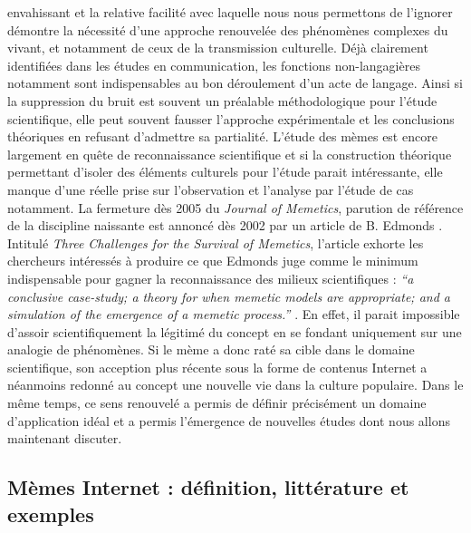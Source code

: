 envahissant et la relative facilit\'e avec laquelle nous nous permettons de l{\textquoteright}ignorer d\'emontre la n\'ecessit\'e d{\textquoteright}une approche renouvel\'ee des ph\'enom\`enes complexes du vivant, et notamment de ceux de la transmission culturelle. D\'ej\`a clairement identifi\'ees dans les \'etudes en communication, les fonctions non-langagi\`eres notamment sont indispensables au bon d\'eroulement d{\textquoteright}un acte de langage. Ainsi si la suppression du bruit est souvent un pr\'ealable m\'ethodologique pour l{\textquoteright}\'etude scientifique, elle peut souvent fausser l{\textquoteright}approche exp\'erimentale et les conclusions th\'eoriques en refusant d{\textquoteright}admettre sa partialit\'e. L{\textquoteright}\'etude des m\`emes est encore largement en qu\^ete de reconnaissance scientifique et si la construction th\'eorique permettant d{\textquoteright}isoler des \'el\'ements culturels pour l{\textquoteright}\'etude parait int\'eressante, elle manque d{\textquoteright}une r\'eelle prise sur l{\textquoteright}observation et l{\textquoteright}analyse par l{\textquoteright}\'etude de cas notamment. La fermeture d\`es 2005 du \textit{Journal of Memetics}, parution de r\'ef\'erence de la discipline naissante est annonc\'e d\`es 2002 par un article de B. Edmonds \citep{Jouxtel2014}. Intitul\'e \textit{Three Challenges for the Survival of Memetics}, l{\textquoteright}article\textit{ }exhorte les chercheurs int\'eress\'es \`a produire ce que Edmonds juge comme le minimum indispensable pour gagner la reconnaissance des milieux scientifiques : \textit{{\textquotedblleft}a conclusive case-study; a theory for when memetic models are appropriate; and a simulation of the emergence of a memetic process.{\textquotedblright}} \citep{Edmonds2002}.  
En effet, il parait impossible d{\textquoteright}assoir scientifiquement la l\'egitim\'e du concept en se fondant uniquement sur une analogie de ph\'enom\`enes. Si le m\`eme a donc rat\'e sa cible dans le domaine scientifique, son acception plus r\'ecente sous la forme de contenus Internet a n\'eanmoins redonn\'e au concept une nouvelle vie dans la culture populaire. Dans le m\^eme temps, ce sens renouvel\'e a permis de d\'efinir pr\'ecis\'ement un domaine d{\textquoteright}application id\'eal et a permis l{\textquoteright}\'emergence de nouvelles \'etudes dont nous allons maintenant discuter. 

\subsection[ M\`emes Internet : d\'efinition, litt\'erature et exemples]{M\`emes Internet : d\'efinition, litt\'erature et exemples}

